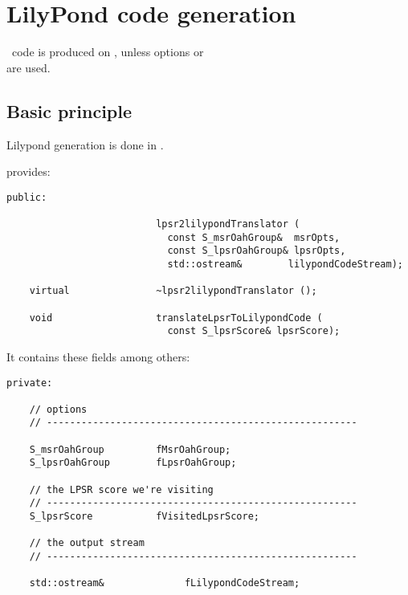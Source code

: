 
\chapter{LilyPond code generation}


\lily\ code is produced on \standardOutput, unless options  or \\
 are used.


\section{Basic principle}

Lilypond generation is done in .

 provides:
\begin{lstlisting}[language=CPlusPlus]
  public:

                          lpsr2lilypondTranslator (
                            const S_msrOahGroup&  msrOpts,
                            const S_lpsrOahGroup& lpsrOpts,
                            std::ostream&        lilypondCodeStream);

    virtual               ~lpsr2lilypondTranslator ();

    void                  translateLpsrToLilypondCode (
                            const S_lpsrScore& lpsrScore);
\end{lstlisting}

It contains these fields among others:
\begin{lstlisting}[language=CPlusPlus]
  private:

    // options
    // ------------------------------------------------------

    S_msrOahGroup         fMsrOahGroup;
    S_lpsrOahGroup        fLpsrOahGroup;

    // the LPSR score we're visiting
    // ------------------------------------------------------
    S_lpsrScore           fVisitedLpsrScore;

    // the output stream
    // ------------------------------------------------------

    std::ostream&              fLilypondCodeStream;
\end{lstlisting}



